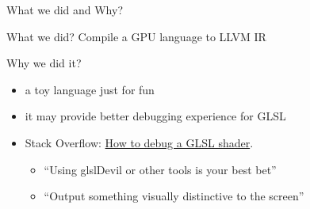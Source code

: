 \begin{frame}{What we did and Why?}
    \begin{block}{What we did?}
        Compile a GPU language to LLVM IR
    \end{block}

    \begin{block}{Why we did it?}
        \begin{itemize}
            \item a toy language just for fun
            \item it may provide better debugging experience for GLSL
            \item Stack Overflow: \href{https://stackoverflow.com/questions/2508818/how-to-debug-a-glsl-shader}{How to debug a GLSL shader}.
            \begin{itemize}
                \item ``Using glslDevil or other tools is your best bet''
                \item ``Output something visually distinctive to the screen''    
            \end{itemize}
        \end{itemize}
    \end{block}

\end{frame}